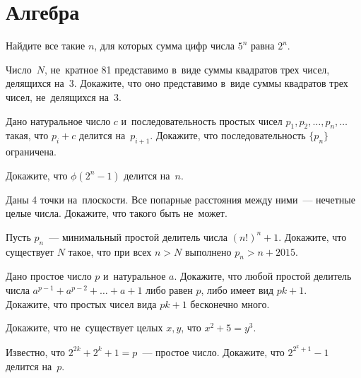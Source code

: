
\section*{Алгебра}


\begin{problems}

\item
Найдите все такие $n$, для которых сумма цифр числа $5^n$ равна $2^n$.

\item
Число~$N$, не~кратное 81 представимо в~виде суммы квадратов трех чисел,
делящихся на~3.
Докажите, что оно представимо в~виде суммы квадратов трех чисел, не~делящихся
на~3.

\item
Дано натуральное число $c$ и~последовательность простых чисел
$p_1, p_2, \ldots, p_n, \ldots$ такая, что $p_i + c$ делится на~$p_{i+1}$.
Докажите, что последовательность $\{p_n\}$ ограничена.

\item
Докажите, что $\phi(2^n - 1)$ делится на~$n$.

\item
Даны 4 точки на~плоскости.
Все попарные расстояния между ними~--- нечетные целые числа.
Докажите, что такого быть не~может. 

\item
Пусть $p_n$~--- минимальный простой делитель числа $(n!)^n + 1$.
Докажите, что существует $N$ такое, что при всех $n > N$ выполнено
$p_n > n + 2015$.

\item
\subproblem
Дано простое число $p$ и~натуральное $a$.
Докажите, что любой простой делитель числа $a^{p-1} + a^{p-2} + \ldots + a + 1$
либо равен $p$, либо имеет вид $p k + 1$.
\\
\subproblem
Докажите, что простых чисел вида $p k + 1$ бесконечно много.

\item
Докажите, что не~существует целых $x, y$, что $x^2 + 5 = y^3$.

\item
Известно, что $2^{2k} + 2^k + 1 = p$~--- простое число.
Докажите, что $2^{2^k+1} - 1$ делится на~$p$.

\end{problems}

